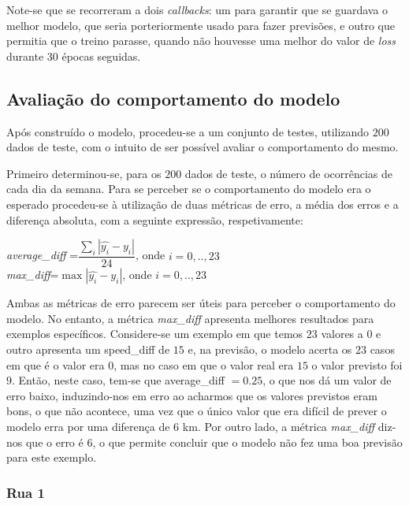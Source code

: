 \documentclass[a4paper, 12pt]{article}
\begin{document}
Note-se que se recorreram a dois \textit{callbacks}: um para garantir que se guardava o melhor modelo, que seria porteriormente usado para fazer previsões, e outro que permitia que o treino parasse, quando não houvesse uma melhor do valor de \textit{loss} durante $30$ épocas seguidas.

\subsection{Avaliação do comportamento do modelo}

Após construído o modelo, procedeu-se a um conjunto de testes, utilizando $200$ dados de teste, com o intuito de ser possível avaliar o comportamento do mesmo.

Primeiro determinou-se, para os $200$ dados de teste, o número de ocorrências de cada dia da semana. Para se perceber se o comportamento do modelo era o esperado procedeu-se à utilização de duas métricas de erro, a média dos erros e a diferença absoluta, com a seguinte expressão, respetivamente:

\begin{center}
	\textit{average\_diff }=$\dfrac{\sum_{i}|\hat{y_i}-y_i|}{24}$, onde $i=0,..,23$\\
	\vspace{0.5cm}
\textit{max\_diff}=$\max{|\hat{y_i}-y_i|}$, onde $i=0,..,23$\\
\end{center}

Ambas as métricas de erro parecem ser úteis para perceber o comportamento do modelo. No entanto, a métrica \textit{max\_diff} apresenta melhores resultados para exemplos específicos. Considere-se um exemplo em que temos $23$ valores a $0$ e outro apresenta um speed\_diff de $15$ e, na previsão, o modelo acerta os $23$ casos em que é o valor era $0$, mas no caso em que o valor real era $15$ o valor previsto foi $9$. Então, neste caso, tem-se que {average\_diff }$=0.25$, o que nos dá um valor de erro baixo, induzindo-nos em erro ao acharmos que os valores previstos eram bons, o que não acontece, uma vez que o único valor que era difícil de prever o modelo erra por uma diferença de $6$ km. Por outro lado, a métrica \textit{max\_diff} diz-nos que o erro é $6$, o que permite concluir que o modelo não fez uma boa previsão para este exemplo.

\subsubsection{Rua 1}
\end{document}
